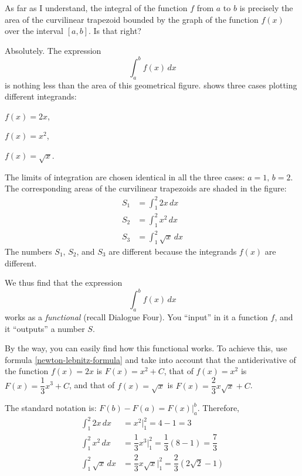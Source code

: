 \rdr As far as I understand, the integral of the function $f$ from $a$ to $b$ is precisely the area of the curvilinear trapezoid bounded by the graph of the function $f (x)$ over the interval $[a, b]$. Is that right?

\athr Absolutely. The expression
\begin{equation*}%
\int_{a}^{b} f(x) \, dx
\end{equation*}
is nothing less than the area of this geometrical figure.  shows three cases plotting different integrands:
\begin{enumerate*}[label=(\alph*)]
\item $f(x) = 2x$, 
\item $f(x) = x^{2}$,
\item $f(x) = \sqrt{x}$. 
\end{enumerate*}

The limits of integration are chosen identical in all the three cases: $a = 1, \, b = 2$. The corresponding areas of the curvilinear trapezoids are shaded in the figure:
\begin{align*}%
S_{1} & = \int_{1}^{2} 2 x \, dx \\
S_{2} & = \int_{1}^{2} x^{2} \, dx \\
S_{3} & = \int_{1}^{2} \sqrt{x} \, dx
\end{align*}
The numbers $S_{1}, \, S_{2}$,	and $S_{3}$ are different because the integrands $f (x)$ are different.

We thus find that the expression
\begin{equation*}%
\int_{a}^{b} f(x) \, dx
\end{equation*}
works as a \emph{functional} (recall Dialogue Four). You ``input'' in it a function $f$, and it ``outputs'' a number $S$.

By the way, you can easily find how this functional works. To achieve this, use formula \eqref{newton-lebnitz-formula} and take into account that the antiderivative of the function $f (x) = 2x$ is $F (x) = x^{2} + C$, that of $f(x) = x^{2}$ is $F(x) = \dfrac{1}{3} x^{3}+C$, and that of $f(x) =\sqrt{x}$ is  $F(x) = \dfrac{2}{3} x \sqrt{x} +C$.

The standard notation is: $F (b) - F (a) = F (x) |_{a}^{b}$. Therefore,
\begin{align*}%
\int_{1}^{2} 2 x \, dx & = x^{2} |_{1}^{2} = 4 - 1 = 3 \\
\int_{1}^{2} x^{2} \, dx & = \dfrac{1}{3} x^{3}|_{1}^{2} =  \dfrac{1}{3} (8 -1) =  \dfrac{7}{3} \\
 \int_{1}^{2} \sqrt{x} \, dx & = \dfrac{2}{3} x \sqrt{x} |_{1}^{2} =  \dfrac{2}{3} (2 \sqrt{2} -1)
\end{align*}


